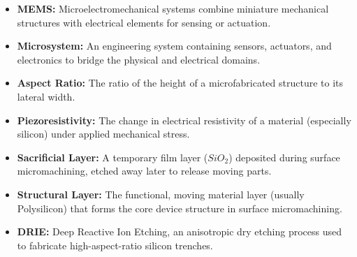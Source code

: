 \documentclass[12pt,a4paper]{article}
\begin{document}
\begin{tcolorbox}[defbox, title={\textbf{One-Line Definitions}}]
\begin{itemize}[leftmargin=*, itemsep=2.5pt, topsep=0pt]
  \item \textbf{MEMS:} Microelectromechanical systems combine miniature mechanical structures with electrical elements for sensing or actuation.
  \item \textbf{Microsystem:} An engineering system containing sensors, actuators, and electronics to bridge the physical and electrical domains.
  \item \textbf{Aspect Ratio:} The ratio of the height of a microfabricated structure to its lateral width.
  \item \textbf{Piezoresistivity:} The change in electrical resistivity of a material (especially silicon) under applied mechanical stress.
  \item \textbf{Sacrificial Layer:} A temporary film layer ($SiO_2$) deposited during surface micromachining, etched away later to release moving parts.
  \item \textbf{Structural Layer:} The functional, moving material layer (usually Polysilicon) that forms the core device structure in surface micromachining.
  \item \textbf{DRIE:} Deep Reactive Ion Etching, an anisotropic dry etching process used to fabricate high-aspect-ratio silicon trenches.
\end{itemize}
\end{tcolorbox}
\end{document}
